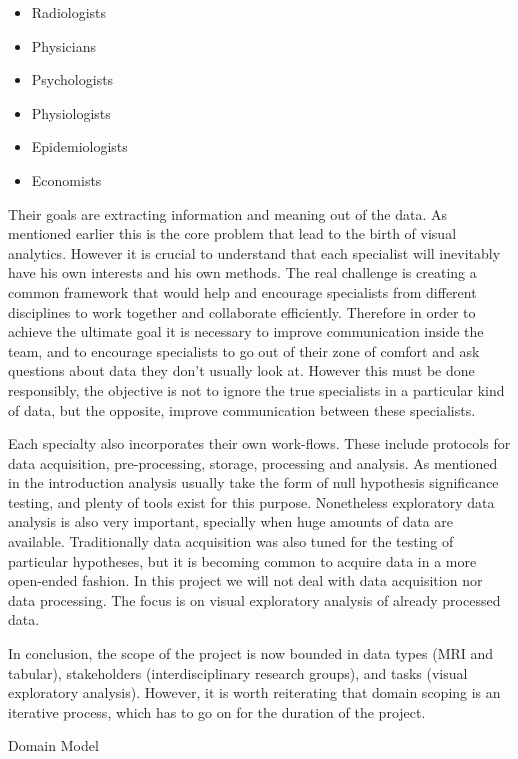 \begin{itemize}
\item Radiologists
\item Physicians
\item Psychologists
\item Physiologists
\item Epidemiologists
\item Economists
\end{itemize}

Their goals are extracting information and meaning out of the data. As mentioned earlier this is the core problem that lead to the birth of visual analytics. However it is crucial to understand that each specialist will inevitably have his own interests and his own methods. The real challenge is creating a common framework that would help and encourage specialists from different disciplines to work together and collaborate efficiently. Therefore in order to achieve the ultimate goal it is necessary to improve communication inside the team, and to encourage specialists to go out of their zone of comfort and ask questions about data they don't usually look at. However this must be done responsibly, the objective is not to ignore the true specialists in a particular kind of data, but the opposite, improve communication between these specialists. 

Each specialty also incorporates their own work-flows. These include protocols for data acquisition, pre-processing, storage, processing and analysis. As mentioned in the introduction analysis usually take the form of null hypothesis significance testing, and plenty of tools exist for this purpose. Nonetheless exploratory data analysis is also very important, specially when huge amounts of data are available. Traditionally data acquisition was also tuned for the testing of particular hypotheses, but it is becoming common to acquire data in a more open-ended fashion. In this project we will not deal with data acquisition nor data processing. The focus is on visual exploratory analysis of already processed data.  

In conclusion, the scope of the project is now bounded in data types (MRI and tabular), stakeholders (interdisciplinary research groups), and tasks (visual exploratory analysis). However, it is worth reiterating that domain scoping is an iterative process, which has to go on for the duration of the project. 

Domain Model

%


